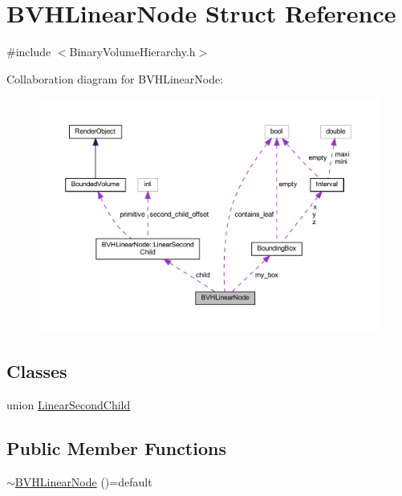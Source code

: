 \hypertarget{structBVHLinearNode}{}\section{B\+V\+H\+Linear\+Node Struct Reference}
\label{structBVHLinearNode}


{\ttfamily \#include $<$Binary\+Volume\+Hierarchy.\+h$>$}



Collaboration diagram for B\+V\+H\+Linear\+Node\+:
\nopagebreak
\begin{figure}[H]
\begin{center}
\leavevmode
\includegraphics[width=350pt]{structBVHLinearNode__coll__graph}
\end{center}
\end{figure}
\subsection*{Classes}
\begin{DoxyCompactItemize}
\item 
union \mbox{\hyperlink{unionBVHLinearNode_1_1LinearSecondChild}{Linear\+Second\+Child}}
\end{DoxyCompactItemize}
\subsection*{Public Member Functions}
\begin{DoxyCompactItemize}
\item 
\mbox{\hyperlink{structBVHLinearNode_ab0e9e423108e944c8c7c5ab6a35aa615}{$\sim$\+B\+V\+H\+Linear\+Node}} ()=default
\end{DoxyCompactItemize}
